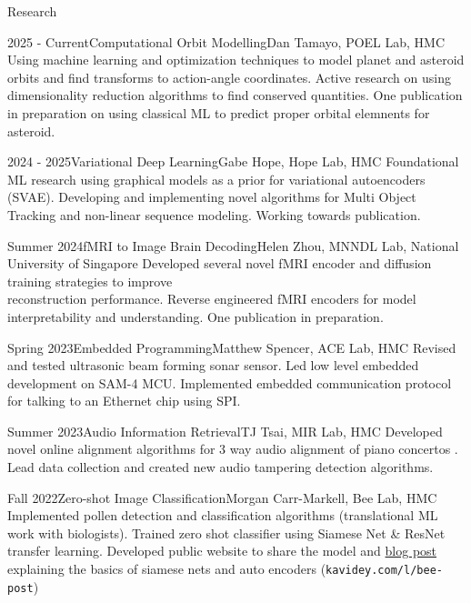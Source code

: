 \documentclass[]{mcdowellcv}
\begin{document}
\begin{cvsection}{Research}
	\begin{cvsubsection}{2025 - Current}{Computational Orbit Modelling}{Dan Tamayo, POEL Lab, HMC}
		Using machine learning and optimization techniques to model planet and asteroid orbits and find transforms to action-angle coordinates.
		Active research on using dimensionality reduction algorithms to find conserved quantities.
		One publication in preparation on using classical ML to predict proper orbital elemnents for asteroid.
	\end{cvsubsection}

	\begin{cvsubsection}{2024 - 2025}{Variational Deep Learning}{Gabe Hope, Hope Lab, HMC}
		Foundational ML research using graphical models as a prior for variational autoencoders (SVAE).
		Developing and implementing novel algorithms for Multi Object Tracking and non-linear sequence modeling. Working towards publication.
	\end{cvsubsection}

	\begin{cvsubsection}{Summer 2024}{fMRI to Image Brain Decoding}{Helen Zhou, MNNDL Lab, National University of Singapore}
			Developed several novel fMRI encoder and diffusion training strategies to improve \\ reconstruction performance.
			Reverse engineered fMRI encoders for model interpretability and understanding. One publication in preparation.
	\end{cvsubsection}

	\begin{cvsubsection}{Spring 2023}{Embedded Programming}{Matthew Spencer, ACE Lab, HMC}
		Revised and tested ultrasonic beam forming sonar sensor. Led low level embedded development on SAM-4 MCU. Implemented embedded communication protocol for talking to an Ethernet chip using SPI.
	\end{cvsubsection}

	\begin{cvsubsection}{Summer 2023}{Audio Information Retrieval}{TJ Tsai, MIR Lab, HMC}
		Developed novel online alignment algorithms for 3 way audio alignment of piano concertos .
		Lead data collection and created new audio tampering detection algorithms.
	\end{cvsubsection}

	\begin{cvsubsection}{Fall 2022}{Zero-shot Image Classification}{Morgan Carr-Markell, Bee Lab, HMC}
		Implemented pollen detection and classification algorithms (translational ML work with biologists).
		Trained zero shot classifier using Siamese Net \& ResNet transfer learning. Developed public website to share the model and \href{https://hmcbee.blogspot.com/2022/12/blue-bees-twin-neural-networks-and-more.html}{blog post} explaining the basics of siamese nets and auto encoders (\texttt{kavidey.com/l/bee-post})
	\end{cvsubsection}


\end{cvsection}
\end{document}
